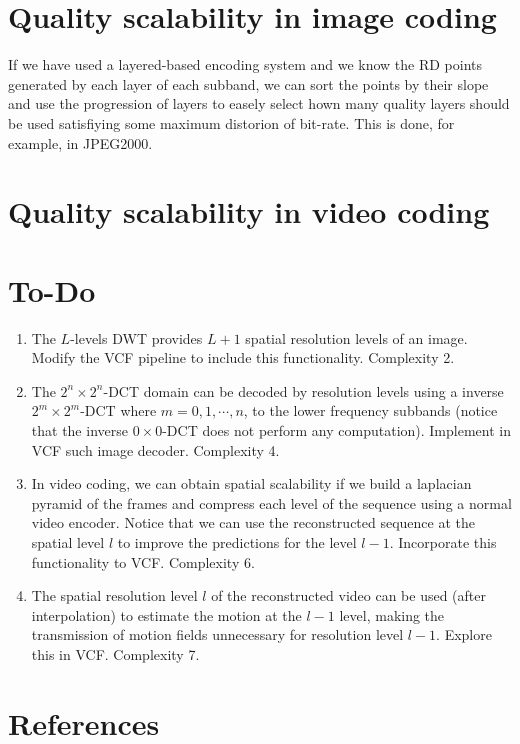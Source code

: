 \section{Quality scalability in image coding}

If we have used a layered-based encoding system and we know the RD
points generated by each layer of each subband, we can sort the points
by their slope and use the progression of layers to easely select hown
many quality layers should be used satisfiying some maximum distorion
of bit-rate. This is done, for example, in JPEG2000.

\section{Quality scalability in video coding}

\section{To-Do}
\begin{enumerate}
\item The $L$-levels DWT provides $L+1$ spatial resolution levels of
  an image. Modify the VCF pipeline to include this
  functionality. Complexity 2.
\item The $2^n\times 2^n$-DCT domain can be decoded by resolution
  levels using a inverse $2^m\times 2^m$-DCT where $m=0,1,\cdots,n$,
  to the lower frequency subbands (notice that the inverse
  $0\times 0$-DCT does not perform any computation). Implement in VCF
  such image decoder. Complexity 4.
\item In video coding, we can obtain spatial scalability if we build a
  laplacian pyramid of the frames and compress each level of the
  sequence using a normal video encoder. Notice that we can use the
  reconstructed sequence at the spatial level $l$ to improve the
  predictions for the level $l-1$. Incorporate this functionality to
  VCF. Complexity 6.
\item The spatial resolution level $l$ of the reconstructed video can
  be used (after interpolation) to estimate the motion at the $l-1$
  level, making the transmission of motion fields unnecessary for
  resolution level $l-1$. Explore this in VCF. Complexity 7.
\end{enumerate}

\section{References}

\renewcommand{\addcontentsline}[3]{}%

